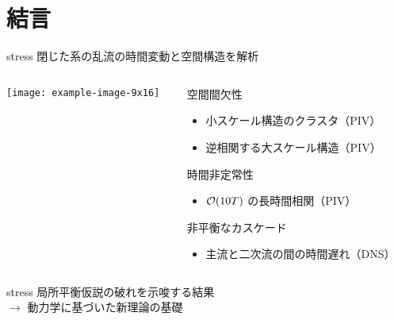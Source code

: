 \documentclass[12pt,dvipdfmx,svgnames,uplatex,aspectratio=169]{beamer}
\newcommand{\cmark}{\ding{51}}%
\begin{document}
\section{結言}
\begin{frame}{\insertsection}
  \hfill
  \begin{beamercolorbox}[rounded=true, wd=0.8\textwidth]{stress}
    \centering
    閉じた系の乱流の時間変動と空間構造を解析
  \end{beamercolorbox}
  \hfill\hfill
  \vspace{\baselineskip}
  \begin{columns}[T]
    \begin{column}{0.3\textwidth}
      \centering
      \texttt{[image: example-image-9x16]}
    \end{column}
    \begin{column}{0.7\textwidth}
      \begin{block}{空間間欠性}
        \vspace{-0.5\baselineskip}
        \begin{itemize}
          \item[\cmark] 小スケール構造のクラスタ（PIV）
          \item[\cmark] 逆相関する大スケール構造（PIV）
        \end{itemize}
      \end{block}
      \begin{block}{時間非定常性}
        \vspace{-0.5\baselineskip}
        \begin{itemize}
          \item[\cmark] \(\order{10T}\) の長時間相関（PIV）
        \end{itemize}
      \end{block}
      \begin{block}{非平衡なカスケード}
        \vspace{-0.5\baselineskip}
        \begin{itemize}
          \item[\cmark] 主流と二次流の間の時間遅れ（DNS）
        \end{itemize}
      \end{block}
    \end{column}
  \end{columns}
  \pause
  \hfill
  \begin{beamercolorbox}[rounded=true, wd=0.8\textwidth]{stress}
    \centering
    局所平衡仮説の破れを示唆する結果\\
    \(\to\) 動力学に基づいた新理論の基礎
  \end{beamercolorbox}
  \hfill\hfill
\end{frame}
\end{document}
